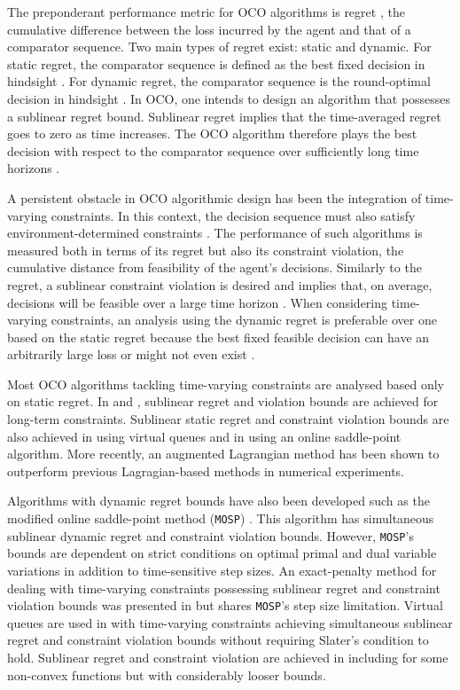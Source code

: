 \documentclass[journal,twoside,web]{ieeecolor}
\begin{document}
The preponderant performance metric for OCO algorithms is regret \cite{Shalev}, the cumulative difference between the loss incurred by the agent and that of a comparator sequence. Two main types of regret exist: static and dynamic. For static regret, the comparator sequence is defined as the best fixed decision in hindsight \cite{zinkevich2003online}. For dynamic regret, the comparator sequence is the round-optimal decision in hindsight \cite{zinkevich2003online, hazanOCO}. In OCO, one intends to design an algorithm that possesses a sublinear regret bound. Sublinear regret implies that the time-averaged regret goes to zero as time increases. The OCO algorithm therefore plays the best decision with respect to the comparator sequence over sufficiently long time horizons \cite{Shalev, hazanOCO}.

A persistent obstacle in OCO algorithmic design has been the integration of time-varying constraints. In this context, the decision sequence must also satisfy environment-determined constraints \cite{MOSP}. The performance of such algorithms is measured both in terms of its regret but also its constraint violation, the cumulative distance from feasibility of the agent's decisions. Similarly to the regret, a sublinear constraint violation is desired and implies that, on average, decisions will be feasible over a large time horizon \cite{JMLR}. When considering time-varying constraints, an analysis using the dynamic regret is preferable over one based on the static regret because the best fixed feasible decision can have an arbitrarily large loss or might not even exist \cite{FTRLTime-Varying}. 

Most OCO algorithms tackling time-varying constraints are analysed based only on static regret. In \cite{JMLR,FTRLTime-Varying} and \cite{HazanInterior}, sublinear regret and violation bounds are achieved for long-term constraints. Sublinear static regret and constraint violation bounds are also achieved in \cite{OnlineEpsilonProof} using virtual queues and in \cite{OnlineConvexBandit} using an online saddle-point algorithm. More recently, an augmented Lagrangian method \cite{LagrangianTime-Varying} has been shown to outperform previous Lagragian-based methods \cite{MOSP, OnlineConvexBandit, OnlineEpsilonProof} in numerical experiments.

Algorithms with dynamic regret bounds have also been developed such as the modified online saddle-point method (\texttt{MOSP}) \cite{MOSP}. This algorithm has simultaneous sublinear dynamic regret and constraint violation bounds. However, \texttt{MOSP}'s bounds are dependent on strict conditions on optimal primal and dual variable variations in addition to time-sensitive step sizes. An exact-penalty method for dealing with time-varying constraints possessing sublinear regret and constraint violation bounds was presented in \cite{L1penalty} but shares \texttt{MOSP}'s step size limitation. Virtual queues are used in \cite{QueueConstrained} with time-varying constraints achieving simultaneous sublinear regret and constraint violation bounds without requiring Slater's condition to hold. Sublinear regret and constraint violation are achieved in \cite{DynamicPolyak} including for some non-convex functions but with considerably looser bounds.
\end{document}
